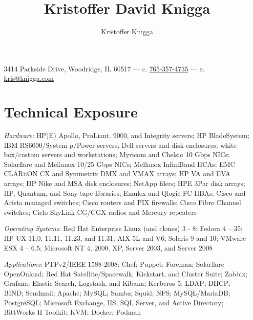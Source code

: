 \documentclass[9pt]{extarticle} %
\title{Kristoffer David Knigga}
\author{Kristoffer Knigga}
\begin{document}



3414 Parkside Drive, Woodridge, IL 60517 \hfill --- \hfill c. \href{tel:765-357-4735}{765-357-4735} \hfill --- \hfill e. \href{mailto:kris@knigga.com}{kris@knigga.com}


\section{Technical Exposure}

\textit{Hardware}: HP(E) Apollo, ProLiant, 9000, and Integrity servers; HP BladeSystem; IBM RS6000/System p/Power servers; Dell servers and disk enclosures; white box/custom servers and workstations; Myricom and Chelsio 10 Gbps NICs; Solarflare and Mellanox 10/25 Gbps NICs; Mellanox InfiniBand HCAs; EMC CLARiiON CX and Symmetrix DMX and VMAX arrays; HP VA and EVA arrays; HP Nike and MSA disk enclosures; NetApp filers; HPE 3Par disk arrays; HP, Quantum, and Sony tape libraries; Emulex and Qlogic FC HBAs; Cisco and Arista managed switches; Cisco routers and PIX firewalls; Cisco Fibre Channel switches; Cielo SkyLink CG/CGX radios and Mercury repeaters
\bigskip

\textit{Operating Systems}: Red Hat Enterprise Linux (and clones) 3 - 8; Fedora 4 -- 35; HP-UX 11.0, 11.11, 11.23, and 11.31; AIX 5L and V6; Solaris 9 and 10; VMware ESX 4 -- 6.5; Microsoft NT 4, 2000, XP, Server 2003, and Server 2008

\bigskip

\textit{Applications}: PTPv2/IEEE 1588-2008; Chef; Puppet; Foreman; Solarflare OpenOnload; Red Hat Satellite/Spacewalk, Kickstart, and Cluster Suite; Zabbix; Grafana; Elastic Search, Logstash, and Kibana; Kerberos 5; LDAP; DHCP; BIND; Sendmail; Apache; MySQL; Samba; Squid; NFS; MySQL/MariaDB; PostgreSQL; Microsoft Exchange, IIS, SQL Server, and Active Directory; BittWorks II Toolkit; KVM; Docker; Podman
\end{document}
